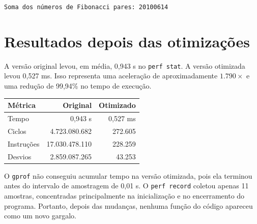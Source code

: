 \documentclass[11pt,a4paper]{article}
\begin{document}
\begin{center}
\texttt{Soma dos números de Fibonacci pares: 20100614}
\end{center}

\newpage

\section{Resultados depois das otimizações}

A versão original levou, em média, 0,943 s no \texttt{perf stat}. A versão otimizada levou 0,527 ms. Isso representa uma aceleração de aproximadamente $1.790\times$ e uma redução de 99,94\% no tempo de execução.

\begin{table}[ht]
\centering
\begin{tabular}{lrr}
\toprule
Métrica & Original & Otimizado \\
\midrule
Tempo & 0,943 s & 0,527 ms \\
Ciclos & 4.723.080.682 & 272.605 \\
Instruções & 17.030.478.110 & 228.259 \\
Desvios & 2.859.087.265 & 43.253 \\
\bottomrule
\end{tabular}
\end{table}

O \texttt{gprof} não conseguiu acumular tempo na versão otimizada, pois ela terminou antes do intervalo de amostragem de 0,01 s. O \texttt{perf record} coletou apenas 11 amostras, concentradas principalmente na inicialização e no encerramento do programa. Portanto, depois das mudanças, nenhuma função do código apareceu como um novo gargalo.
\end{document}

